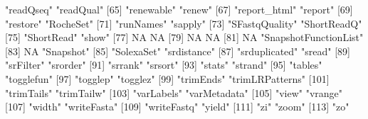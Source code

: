 \documentclass{beamer}
\begin{document}
\begin{frame}[fragile]
\begin{columns}
\begin{column}{0.65\textwidth}
\begin{uncoverenv}
\begin{Schunk}
\begin{Soutput}
 [63] "readQseq"                      "readQual"                     
 [65] "renewable"                     "renew"                        
 [67] "report_html"                   "report"                       
 [69] "restore"                       "RocheSet"                     
 [71] "runNames"                      "sapply"                       
 [73] "SFastqQuality"                 "ShortReadQ"                   
 [75] "ShortRead"                     "show"                         
 [77] NA                              NA                             
 [79] NA                              NA                             
 [81] NA                              "SnapshotFunctionList"         
 [83] NA                              "Snapshot"                     
 [85] "SolexaSet"                     "srdistance"                   
 [87] "srduplicated"                  "sread"                        
 [89] "srFilter"                      "srorder"                      
 [91] "srrank"                        "srsort"                       
 [93] "stats"                         "strand"                       
 [95] "tables"                        "togglefun"                    
 [97] "togglep"                       "togglez"                      
 [99] "trimEnds"                      "trimLRPatterns"               
[101] "trimTails"                     "trimTailw"                    
[103] "varLabels"                     "varMetadata"                  
[105] "view"                          "vrange"                       
[107] "width"                         "writeFasta"                   
[109] "writeFastq"                    "yield"                        
[111] "zi"                            "zoom"                         
[113] "zo"                           
\end{Soutput}
\end{Schunk}
       \end{uncoverenv} 
  \end{column}
  \end{columns}
\end{frame}

\end{document}
